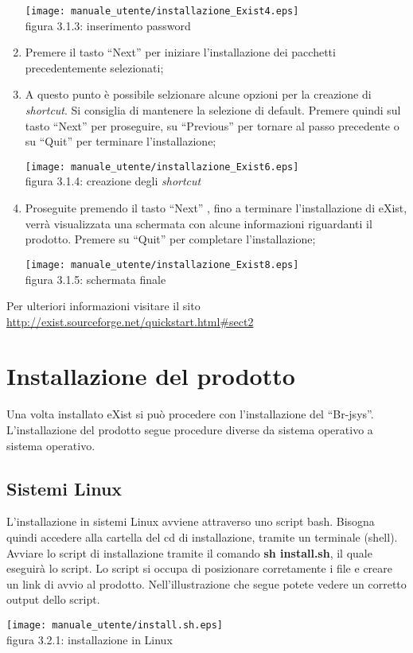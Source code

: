 \begin{enumerate}
\begin{center}
\texttt{[image: manuale\_utente/installazione\_Exist4.eps]}\\
 figura 3.1.3: inserimento password
\end{center}
\item Premere il tasto ``Next'' per iniziare l'installazione dei pacchetti precedentemente selezionati;
\item A questo punto \`e possibile selzionare alcune opzioni per la creazione di \textit{shortcut}. Si consiglia di mantenere la selezione di default. Premere quindi sul tasto ``Next'' per proseguire, su ``Previous'' per tornare al passo precedente o su ``Quit'' per terminare l'installazione;
\begin{center}
\texttt{[image: manuale\_utente/installazione\_Exist6.eps]}\\
 figura 3.1.4: creazione degli \textit{shortcut}
\end{center}
\item Proseguite premendo il tasto ``Next'' , fino a terminare l'installazione di eXist, verr\`a visualizzata una schermata con alcune informazioni riguardanti il prodotto. Premere su ``Quit'' per completare l'installazione;
\begin{center}
\texttt{[image: manuale\_utente/installazione\_Exist8.eps]}\\
 figura 3.1.5: schermata finale
\end{center}
\end{enumerate}
Per ulteriori informazioni visitare il sito\\
 \href{http://exist.sourceforge.net/quickstart.html\#sect2}{ http://exist.sourceforge.net/quickstart.html\#sect2}

\section{Installazione del prodotto}
Una volta installato eXist si pu\`o procedere con l'installazione del ``Br-jsys''.
L'installazione del prodotto segue procedure diverse da sistema operativo a sistema operativo.

\subsection{Sistemi Linux}
L'installazione in sistemi Linux avviene attraverso uno script bash. Bisogna quindi  accedere alla cartella del cd di installazione,  tramite un terminale (shell). Avviare lo script di installazione tramite il comando \textbf{sh install.sh}, il quale eseguir\`a lo script.
Lo script si occupa di posizionare corretamente i file e creare un link di avvio al prodotto.
Nell'illustrazione che segue potete vedere un corretto output dello script.\\
\begin{center}
\texttt{[image: manuale\_utente/install.sh.eps]}\\
 figura 3.2.1: installazione in Linux
\end{center}

